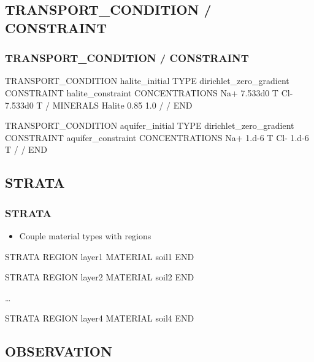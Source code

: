 \documentclass{beamer}
\begin{document}
\subsection{TRANSPORT\_CONDITION / CONSTRAINT}

\begin{frame}\frametitle{TRANSPORT\_CONDITION / CONSTRAINT}

{
\begin{semiverbatim}

TRANSPORT_CONDITION halite_initial
  TYPE dirichlet_zero_gradient
  CONSTRAINT halite_constraint
    CONCENTRATIONS
      Na+ 7.533d0  T
      Cl- 7.533d0  T
    /
    MINERALS
      Halite 0.85 1.0
    /
  /
END

TRANSPORT_CONDITION aquifer_initial
  TYPE dirichlet_zero_gradient
  CONSTRAINT aquifer_constraint
    CONCENTRATIONS
      Na+ 1.d-6  T
      Cl- 1.d-6  T    
    /
  /
END
\end{semiverbatim}
}

\end{frame}

\subsection{STRATA}

\begin{frame}[fragile]\frametitle{STRATA}

\begin{itemize}
\item Couple material types with regions
\end{itemize}

\begin{semiverbatim}
STRATA
  REGION layer1
  MATERIAL soil1
END

STRATA
  REGION layer2
  MATERIAL soil2
END

\ldots

STRATA
  REGION layer4
  MATERIAL soil4
END
\end{semiverbatim}

\end{frame}


\subsection{OBSERVATION}
\end{document}
